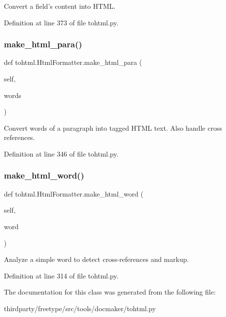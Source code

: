 \begin{DoxyVerb}Convert a field's content into HTML.\end{DoxyVerb}
 

Definition at line 373 of file tohtml.\+py.

\mbox{\label{classtohtml_1_1_html_formatter_a8c7fac47f3d089b2756287b0c4e6034f}} 
\subsubsection{\texorpdfstring{make\+\_\+html\+\_\+para()}{make\_html\_para()}}
{\footnotesize\ttfamily def tohtml.\+Html\+Formatter.\+make\+\_\+html\+\_\+para (\begin{DoxyParamCaption}\item[{}]{self,  }\item[{}]{words }\end{DoxyParamCaption})}

\begin{DoxyVerb}Convert words of a paragraph into tagged HTML text.  Also handle
   cross references.\end{DoxyVerb}
 

Definition at line 346 of file tohtml.\+py.

\mbox{\label{classtohtml_1_1_html_formatter_a7eeb95b937b988a88537e32ace23a65f}} 
\subsubsection{\texorpdfstring{make\+\_\+html\+\_\+word()}{make\_html\_word()}}
{\footnotesize\ttfamily def tohtml.\+Html\+Formatter.\+make\+\_\+html\+\_\+word (\begin{DoxyParamCaption}\item[{}]{self,  }\item[{}]{word }\end{DoxyParamCaption})}

\begin{DoxyVerb}Analyze a simple word to detect cross-references and markup.\end{DoxyVerb}
 

Definition at line 314 of file tohtml.\+py.



The documentation for this class was generated from the following file\+:\begin{DoxyCompactItemize}
\item 
thirdparty/freetype/src/tools/docmaker/tohtml.\+py\end{DoxyCompactItemize}
